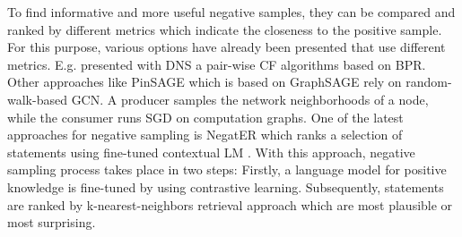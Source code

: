 To find informative and more useful negative samples, they can be compared and ranked by different metrics which indicate the closeness to the positive sample.
For this purpose, various options have already been presented that use different metrics.
E.g. \cite{DNS} presented with \ac{DNS} a pair-wise \ac{CF} algorithms based on \ac{BPR}.
Other approaches like \ac{PinSAGE} \cite{PinSAGE} which is based on \ac{GraphSAGE} \cite{GraphSAGE} rely on random-walk-based \ac{GCN}. 
A producer samples the network neighborhoods of a node, while the consumer 
runs \ac{SGD} on computation graphs.    
One of the latest approaches for negative sampling is \ac{NegatER}
which ranks a selection of statements using fine-tuned contextual \ac{LM} \cite{safavi2021negater}.
With this approach, negative sampling process takes place in two steps:
Firstly, a language model for positive knowledge is fine-tuned by using contrastive learning.
Subsequently, statements are ranked by k-nearest-neighbors retrieval approach which are most plausible or most surprising.

